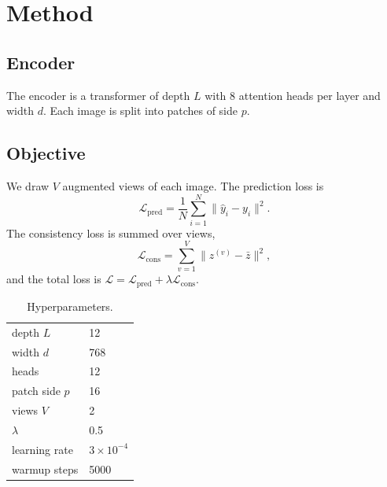\section{Method}
\subsection{Encoder}
The encoder is a transformer of depth $L$ with 8 attention heads per layer and width $d$.
Each image is split into patches of side $p$.

\subsection{Objective}
We draw $V$ augmented views of each image. The prediction loss is
\begin{equation}
\mathcal{L}_{\mathrm{pred}} = \frac{1}{N}\sum_{i=1}^{N} \lVert \hat{y}_i - y_i \rVert^2 .
\end{equation}
The consistency loss is summed over views,
\begin{equation}
\mathcal{L}_{\mathrm{cons}} = \sum_{v=1}^{V} \lVert z^{(v)} - \bar{z} \rVert^2 ,
\end{equation}
and the total loss is $\mathcal{L} = \mathcal{L}_{\mathrm{pred}} + \lambda \mathcal{L}_{\mathrm{cons}}$.

\begin{table}[h]
\centering
\caption{Hyperparameters.}
\begin{tabular}{ll}
depth $L$ & 12 \\
width $d$ & 768 \\
heads & 12 \\
patch side $p$ & 16 \\
views $V$ & 2 \\
$\lambda$ & 0.5 \\
learning rate & $3\times10^{-4}$ \\
warmup steps & 5000 \\
\end{tabular}
\end{table}
